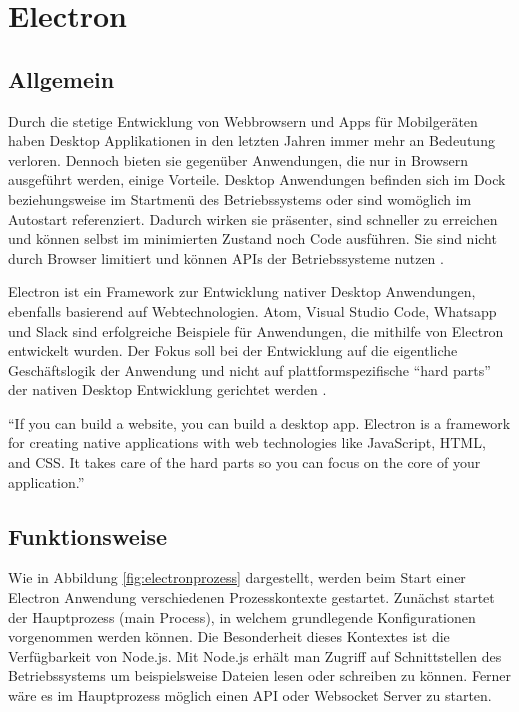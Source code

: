 \section{Electron}
\subsection{Allgemein}

Durch die stetige Entwicklung von Webbrowsern und Apps für Mobilgeräten haben Desktop Applikationen in den letzten Jahren immer mehr an Bedeutung verloren.
Dennoch bieten sie gegenüber Anwendungen, die nur in Browsern ausgeführt werden, einige Vorteile.
Desktop Anwendungen befinden sich im Dock beziehungsweise im Startmenü des Betriebssystems oder sind womöglich im Autostart referenziert.
Dadurch wirken sie präsenter, sind schneller zu erreichen und können selbst im minimierten Zustand noch Code ausführen.
Sie sind nicht durch Browser limitiert und können APIs der Betriebssysteme nutzen \cite{Build58:online}.

Electron ist ein Framework zur Entwicklung nativer Desktop Anwendungen, ebenfalls basierend auf Webtechnologien.
Atom, Visual Studio Code, Whatsapp und Slack sind erfolgreiche Beispiele für Anwendungen, die mithilfe von Electron
entwickelt wurden.
Der Fokus soll bei der Entwicklung auf die eigentliche Geschäftslogik der Anwendung und nicht auf plattformspezifische
``hard parts'' der nativen Desktop Entwicklung gerichtet werden \cite{Elect57:online}.

\vspace{0.3cm}
``If you can build a website, you can build a desktop app. Electron is a framework for creating native applications
with web technologies like JavaScript, HTML, and CSS. It takes care of the hard parts so you can focus on the core of
your application.''
\cite{Elect57:online}

\subsection{Funktionsweise}
\label{sec:functionsweise}


Wie in Abbildung \ref{fig:electronprozess} dargestellt, werden beim Start einer
Electron Anwendung verschiedenen Prozesskontexte gestartet.
Zunächst startet der Hauptprozess (main Process), in welchem grundlegende Konfigurationen vorgenommen werden können.
Die Besonderheit dieses Kontextes ist die Verfügbarkeit von Node.js.
Mit Node.js erhält man Zugriff auf Schnittstellen des Betriebssystems um beispielsweise Dateien lesen oder schreiben zu können.
Ferner wäre es im Hauptprozess möglich einen API oder Websocket Server zu starten.

